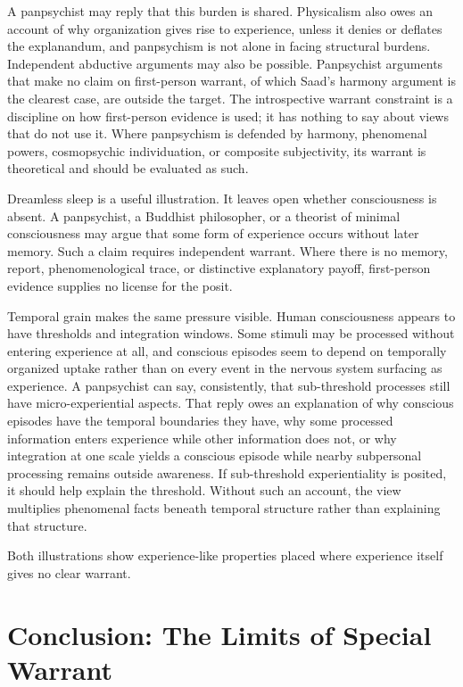 A panpsychist may reply that this burden is shared. Physicalism also owes an account of why organization gives rise to experience, unless it denies or deflates the explanandum, and panpsychism is not alone in facing structural burdens. Independent abductive arguments may also be possible. Panpsychist arguments that make no claim on first-person warrant, of which Saad's harmony argument is the clearest case, are outside the target. The introspective warrant constraint is a discipline on how first-person evidence is used; it has nothing to say about views that do not use it. Where panpsychism is defended by harmony, phenomenal powers, cosmopsychic individuation, or composite subjectivity, its warrant is theoretical and should be evaluated as such.

Dreamless sleep is a useful illustration. It leaves open whether consciousness is absent. A panpsychist, a Buddhist philosopher, or a theorist of minimal consciousness may argue that some form of experience occurs without later memory. Such a claim requires independent warrant. Where there is no memory, report, phenomenological trace, or distinctive explanatory payoff, first-person evidence supplies no license for the posit.

Temporal grain makes the same pressure visible. Human consciousness appears to have thresholds and integration windows. Some stimuli may be processed without entering experience at all, and conscious episodes seem to depend on temporally organized uptake rather than on every event in the nervous system surfacing as experience. A panpsychist can say, consistently, that sub-threshold processes still have micro-experiential aspects. That reply owes an explanation of why conscious episodes have the temporal boundaries they have, why some processed information enters experience while other information does not, or why integration at one scale yields a conscious episode while nearby subpersonal processing remains outside awareness. If sub-threshold experientiality is posited, it should help explain the threshold. Without such an account, the view multiplies phenomenal facts beneath temporal structure rather than explaining that structure.

Both illustrations show experience-like properties placed where experience itself gives no clear warrant.

\section{Conclusion: The Limits of Special Warrant}

